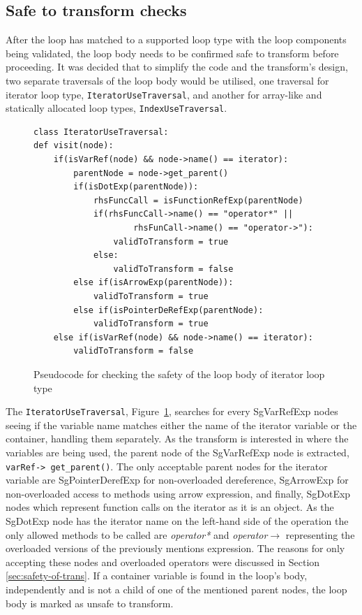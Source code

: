 \documentclass[bsc,frontabs,singlespacing,twoside,parskip,deptreport]{infthesis}
\begin{document}
\subsection{Safe to transform checks}

After the loop has matched to a supported loop type with the loop components being validated, the loop body needs to be confirmed safe to transform before proceeding. It was decided that to simplify the code and the transform's design, two separate traversals of the loop body would be utilised, one traversal for iterator loop type, \texttt{IteratorUseTraversal}, and another for array-like and statically allocated loop types, \texttt{IndexUseTraversal}. 

\begin{figure}[H]
    \centering
    \begin{verbatim}
class IteratorUseTraversal:
def visit(node):
    if(isVarRef(node) && node->name() == iterator):
        parentNode = node->get_parent()
        if(isDotExp(parentNode)):
            rhsFuncCall = isFunctionRefExp(parentNode)
            if(rhsFuncCall->name() == "operator*" ||
                    rhsFunCall->name() == "operator->"):
                validToTransform = true 
            else:
                validToTransform = false
        else if(isArrowExp(parentNode)):
            validToTransform = true
        else if(isPointerDeRefExp(parentNode):
            validToTransform = true
    else if(isVarRef(node) && node->name() == iterator):
        validToTransform = false
    \end{verbatim}
    \caption{Pseudocode for checking the safety of the loop body of iterator loop type }
    \label{fig:pse-code-safe-check-iter}
\end{figure}


The \texttt{IteratorUseTraversal}, Figure~\ref{fig:pse-code-safe-check-iter}, searches for every SgVarRefExp nodes seeing if the variable name matches either the name of the iterator variable or the container, handling them separately. As the transform is interested in where the variables are being used, the parent node of the SgVarRefExp node is extracted, \texttt{varRef-> get\_parent()}. The only acceptable parent nodes for the iterator variable are SgPointerDerefExp for non-overloaded dereference, SgArrowExp for non-overloaded access to methods using arrow expression, and finally, SgDotExp nodes which represent function calls on the iterator as it is an object. As the SgDotExp node has the iterator name on the left-hand side of the operation the only allowed methods to be called are \textit{operator*} and \textit{operator$\rightarrow$} representing the overloaded versions of the previously mentions expression. The reasons for only accepting these nodes and overloaded operators were discussed in Section \ref{sec:safety-of-trans}. If a container variable is found in the loop's body, independently and is not a child of one of the mentioned parent nodes, the loop body is marked as unsafe to transform.
\end{document}
